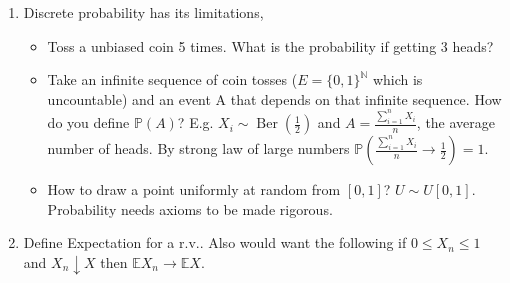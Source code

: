     \begin{enumerate}
        \item Discrete probability has its limitations,
        \begin{itemize}
            \item Toss a unbiased coin 5 times. What is the probability if getting 3 heads?
            \item Take an infinite sequence of coin tosses ($E = \{0, 1\}^\mathbb{N}$ which is uncountable) and an event A that depends on that infinite sequence. How do you define $\mathbb{P}(A)$?
            E.g. $X_i \sim \operatorname{Ber}\left( \frac{1}{2} \right)$ and $A = \frac{\sum_{i=1}^{n} X_i}{n}$, the average number of heads.
            By strong law of large numbers $\mathbb{P}\left( \frac{\sum_{i=1}^{n} X_i}{n} \to \frac{1}{2} \right) = 1$.
            \item How to draw a point uniformly at random from $[0, 1]$? $U \sim U[0, 1]$.
            Probability needs axioms to be made rigorous.
        \end{itemize}
        \item Define Expectation for a r.v.. Also would want the following if $0 \leq X_n \leq 1$ and $X_n \downarrow X$ then $\mathbb{E} X_n \to \mathbb{E} X$.
    \end{enumerate}

    
    
    
    
    
    
    

